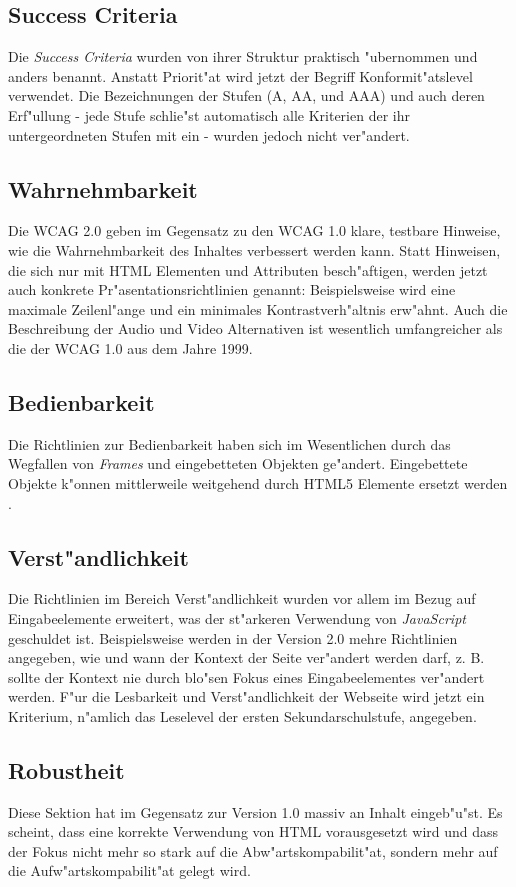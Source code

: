 \documentclass[a4paper,bibtotoc,oneside]{scrbook}
\begin{document}
\subsection{Success Criteria}
Die \emph{Success Criteria} wurden von ihrer Struktur praktisch "ubernommen und anders benannt. Anstatt Priorit"at wird jetzt der Begriff Konformit"atslevel verwendet. Die Bezeichnungen der Stufen (A, AA, und AAA) und auch deren Erf"ullung - jede Stufe schlie"st automatisch alle Kriterien der ihr untergeordneten Stufen mit ein - wurden jedoch nicht ver"andert.

\subsection{Wahrnehmbarkeit}
Die WCAG 2.0 geben im Gegensatz zu den WCAG 1.0 klare, testbare Hinweise, wie die Wahrnehmbarkeit des Inhaltes verbessert werden kann. Statt Hinweisen, die sich nur mit HTML Elementen und Attributen besch"aftigen, werden jetzt auch konkrete Pr"asentationsrichtlinien genannt: Beispielsweise wird eine maximale Zeilenl"ange und ein minimales Kontrastverh"altnis erw"ahnt. Auch die Beschreibung der Audio und Video Alternativen ist wesentlich umfangreicher als die der WCAG 1.0 aus dem Jahre 1999.

\subsection{Bedienbarkeit}
Die Richtlinien zur Bedienbarkeit haben sich im Wesentlichen durch das Wegfallen von \emph{Frames} und eingebetteten Objekten ge"andert. Eingebettete Objekte k"onnen mittlerweile weitgehend durch HTML5 Elemente ersetzt werden \cite [Abschnitt audio und video element]{html5}.


\subsection{Verst"andlichkeit}
Die Richtlinien im Bereich Verst"andlichkeit wurden vor allem im Bezug auf Eingabeelemente erweitert, was der st"arkeren Verwendung von \emph{JavaScript} geschuldet ist. Beispielsweise werden in der Version 2.0 mehre Richtlinien angegeben, wie und wann der Kontext der Seite ver"andert werden darf, z. B. sollte der Kontext nie durch blo"sen Fokus eines Eingabeelementes ver"andert werden. F"ur die Lesbarkeit und Verst"andlichkeit der Webseite wird jetzt ein Kriterium, n"amlich das Leselevel der ersten Sekundarschulstufe, angegeben.

\subsection{Robustheit}
Diese Sektion hat im Gegensatz zur Version 1.0 massiv an Inhalt eingeb"u"st. Es scheint, dass eine korrekte Verwendung von HTML vorausgesetzt wird und dass der Fokus nicht mehr so stark auf die Abw"artskompabilit"at, sondern mehr auf die Aufw"artskompabilit"at gelegt wird.
\end{document}
